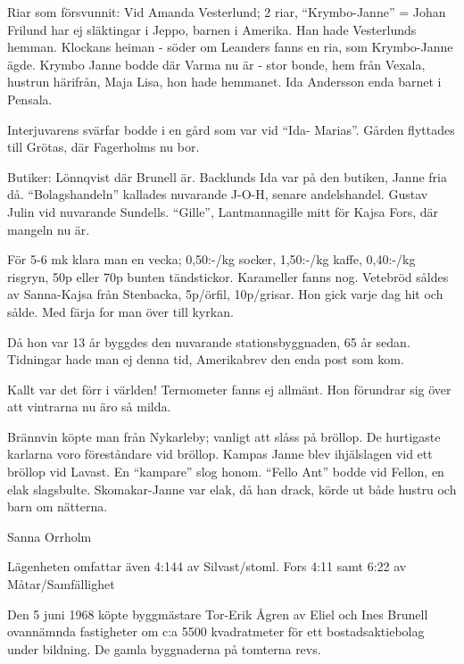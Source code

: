 Riar som försvunnit: Vid Amanda Vesterlund; 2 riar,  ``Krymbo-Janne'' = Johan Frilund har ej släktingar i Jeppo, barnen i Amerika. Han hade Vesterlunds hemman. Klockans heiman - söder om Leanders fanns en ria, som Krymbo-Janne ägde. Krymbo Janne bodde där Varma nu är - stor bonde, hem från Vexala, hustrun härifrån, Maja Lisa, hon hade hemmanet. Ida Andersson enda barnet i Pensala.

Interjuvarens svärfar bodde i en gård som var vid ``Ida- Marias''. Gården flyttades till Grötas, där Fagerholms nu bor.

Butiker: Lönnqvist där Brunell är. Backlunds Ida var på den butiken, Janne fria då. ``Bolagshandeln'' kallades nuvarande J-O-H, senare andelshandel. Gustav Julin vid nuvarande Sundells.  ``Gille'', Lantmannagille mitt för Kajsa Fors, där mangeln nu är.

För 5-6 mk klara man en vecka; 0,50:-/kg socker, 1,50:-/kg kaffe, 0,40:-/kg risgryn, 50p eller 70p bunten tändstickor.  Karameller fanns nog. Vetebröd såldes av Sanna-Kajsa från Stenbacka, 5p/örfil, 10p/grisar. Hon gick varje dag hit och sålde. Med färja for man över till kyrkan.

Då hon var 13 år byggdes den nuvarande stationsbyggnaden, 65 år sedan. Tidningar hade man ej denna tid, Amerikabrev den enda post som kom.

Kallt var det förr i världen! Termometer fanns ej allmänt. Hon förundrar sig över att vintrarna nu äro så milda.

Brännvin köpte man från Nykarleby; vanligt att slåss på bröllop. De hurtigaste karlarna voro föreståndare vid bröllop. Kampas Janne blev ihjälslagen vid ett bröllop vid Lavast. En ``kampare'' slog honom. ``Fello Ant''  bodde vid Fellon, en elak slagsbulte. Skomakar-Janne var elak, då han drack, körde ut både hustru och barn om nätterna.

Sanna Orrholm




Lägenheten omfattar även  4:144 av Silvast/stoml. Fors 4:11	samt  6:22 av Måtar/Samfällighet

Den 5 juni 1968 köpte byggmästare Tor-Erik Ågren av Eliel och Ines Brunell ovannämnda fastigheter om c:a 5500 kvadratmeter för ett bostadsaktiebolag under bildning. De gamla byggnaderna på tomterna revs.

